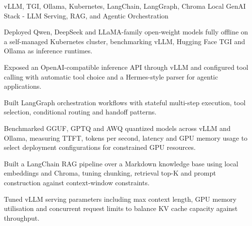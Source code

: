 

\begin{cventries}
	
	\cventry
	{vLLM, TGI, Ollama, Kubernetes, LangChain, LangGraph, Chroma} %
	{Local GenAI Stack - LLM Serving, RAG, and Agentic Orchestration} %
	{}
	{}
	{
		\begin{cvitems}
			\item {Deployed Qwen, DeepSeek and LLaMA-family open-weight models fully offline on a self-managed Kubernetes cluster, benchmarking vLLM, Hugging Face TGI and Ollama as inference runtimes.}
		    \item {Exposed an OpenAI-compatible inference API through vLLM and configured tool calling with automatic tool choice and a Hermes-style parser for agentic applications.}
		   \item {Built LangGraph orchestration workflows with stateful multi-step execution, tool selection, conditional routing and handoff patterns.}
	       	\item {Benchmarked GGUF, GPTQ and AWQ quantized models across vLLM and Ollama, measuring TTFT, tokens per second, latency and GPU memory usage to select deployment configurations for constrained GPU resources.}
	    	\item {Built a LangChain RAG pipeline over a Markdown knowledge base using local embeddings and Chroma, tuning chunking, retrieval top-K and prompt construction against context-window constraints.}
	    	\item {Tuned vLLM serving parameters including max context length, GPU memory utilisation and concurrent request limits to balance KV cache capacity against throughput.}
	    \end{cvitems}
	}

    

\end{cventries}
